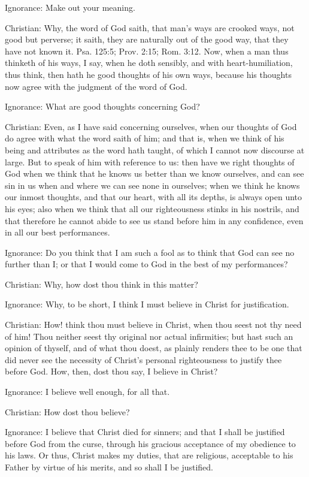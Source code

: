 Ignorance: Make out your meaning.

Christian: Why, the word of God saith, that man's ways are crooked ways, not good but perverse; it saith, they are naturally out of the good way, that they have not known it. Psa. 125:5; Prov. 2:15; Rom. 3:12. Now, when a man thus thinketh of his ways, I say, when he doth sensibly, and with heart-humiliation, thus think, then hath he good thoughts of his own ways, because his thoughts now agree with the judgment of the word of God.

Ignorance: What are good thoughts concerning God?

Christian: Even, as I have said concerning ourselves, when our thoughts of God do agree with what the word saith of him; and that is, when we think of his being and attributes as the word hath taught, of which I cannot now discourse at large. But to speak of him with reference to us: then have we right thoughts of God when we think that he knows us better than we know ourselves, and can see sin in us when and where we can see none in ourselves; when we think he knows our inmost thoughts, and that our heart, with all its depths, is always open unto his eyes; also when we think that all our righteousness stinks in his nostrils, and that therefore he cannot abide to see us stand before him in any confidence, even in all our best performances.

Ignorance: Do you think that I am such a fool as to think that God can see no further than I; or that I would come to God in the best of my performances?

Christian: Why, how dost thou think in this matter?

Ignorance: Why, to be short, I think I must believe in Christ for justification.

Christian: How! think thou must believe in Christ, when thou seest not thy need of him! Thou neither seest thy original nor actual infirmities; but hast such an opinion of thyself, and of what thou doest, as plainly renders thee to be one that did never see the necessity of Christ's personal righteousness to justify thee before God. How, then, dost thou say, I believe in Christ?

Ignorance: I believe well enough, for all that.

Christian: How dost thou believe?

Ignorance: I believe that Christ died for sinners; and that I shall be justified before God from the curse, through his gracious acceptance of my obedience to his laws. Or thus, Christ makes my duties, that are religious, acceptable to his Father by virtue of his merits, and so shall I be justified.

